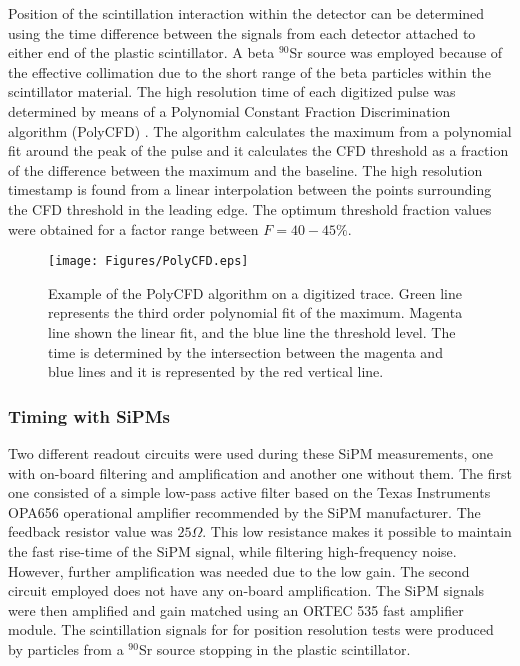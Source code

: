 Position of the scintillation interaction within the detector can be determined using the time difference between the signals from each detector attached to either end of the plastic scintillator. A beta $^{90}$Sr source was employed because of the effective collimation due to the short range of the beta particles within the scintillator material. The high resolution time of each digitized pulse was determined by means of a Polynomial Constant Fraction Discrimination  algorithm (PolyCFD) \cite{PhDCory}. The algorithm calculates the maximum from a polynomial fit around the peak of the pulse and it calculates the CFD threshold as a fraction of the difference between the maximum and the baseline. The high resolution timestamp is found from a linear interpolation between the points surrounding the CFD threshold in the leading edge. The optimum threshold fraction values were obtained for a factor range between $F=40-45\%$.

\begin{figure}[hbt]
\centering
\texttt{[image: Figures/PolyCFD.eps]}
\caption{Example of the PolyCFD algorithm on a digitized trace. Green line represents the third order polynomial fit of the maximum. Magenta line shown the linear fit, and the blue line the threshold level. The time is determined by the intersection between the magenta and blue lines and it is represented by the red vertical line.}
\label{fig:PolyCFD}
\end{figure}

\subsubsection{Timing with SiPMs}
Two different readout circuits were used during these SiPM measurements, one with on-board  filtering and amplification and another one without them. The first one consisted of a simple low-pass active filter based on the Texas Instruments\textsuperscript{\textregistered} OPA656 operational amplifier recommended by the SiPM manufacturer. The feedback resistor value was $25\Omega$. This low resistance makes it possible to maintain the fast rise-time of the SiPM signal, while filtering high-frequency noise. However, further amplification was needed due to the low gain.  The second circuit employed does not have any on-board amplification. The SiPM signals were then amplified and gain matched using an ORTEC\textsuperscript{\textregistered} 535 fast amplifier module. The scintillation signals for for position resolution tests were produced by particles from a $^{90}$Sr source stopping in the plastic scintillator.

